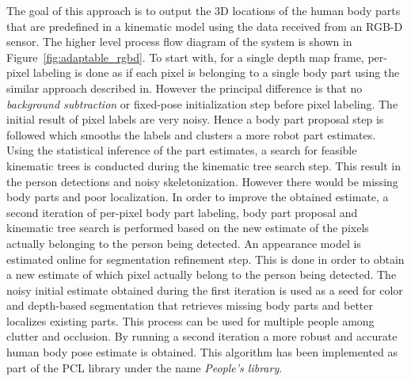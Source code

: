 The goal of this approach is to output the 3D locations of the human body parts that are predefined in a kinematic model using the data received from an RGB-D sensor. The higher level process flow diagram of the system is shown in Figure~\ref{fig:adaptable_rgbd}. To start with, for a single depth map frame, per-pixel labeling is done as if each pixel is belonging to a single body part using the similar approach described in\cite{Shotton2011}. However the principal difference is that no \emph{background subtraction} or fixed-pose initialization step before pixel labeling. The initial result of pixel labels are very noisy. Hence a body part proposal step is followed which smooths the labels and clusters a more robot part estimates. Using the statistical inference of the part estimates, a search for feasible kinematic trees is conducted during the kinematic tree search step. This result in the person detections and noisy skeletonization. However there would be missing body parts and poor localization. In order to improve the obtained estimate, a second iteration of per-pixel body part labeling, body part proposal and kinematic tree search is performed based on the new estimate of the pixels actually belonging to the person being detected. An appearance model is estimated online for segmentation refinement step. This is done in order to obtain a new estimate of which pixel actually belong to the person being detected. The noisy initial estimate obtained during the first iteration is used as a seed for color and depth-based segmentation that retrieves missing body parts and better localizes existing parts. This process can be used for multiple people among clutter and occlusion. By running a second iteration a more robust and accurate human body pose estimate is obtained. This algorithm has been implemented as part of the PCL\cite{RusuPCL11} library under the name \emph{People's library}.

